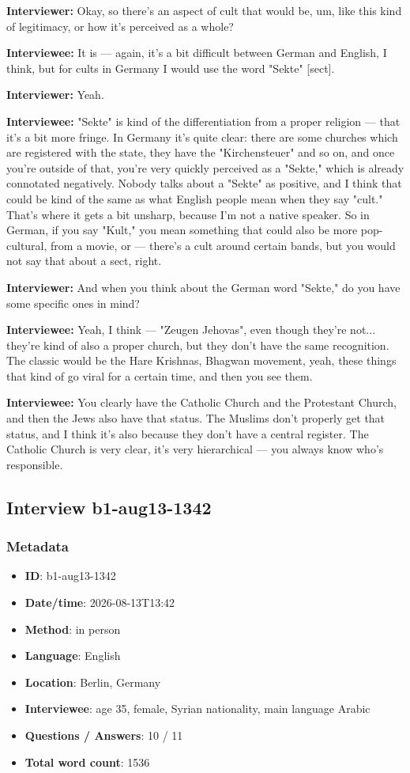 \textbf{Interviewer:} Okay, so there's an aspect of cult that would be, um, like this kind of legitimacy, or how it's perceived as a whole?

\textbf{Interviewee:} It is — again, it's a bit difficult between German and English, I think, but for cults in Germany I would use the word "Sekte" [sect].

\textbf{Interviewer:} Yeah.

\textbf{Interviewee:} "Sekte" is kind of the differentiation from a proper religion — that it's a bit more fringe. In Germany it's quite clear: there are some churches which are registered with the state, they have the "Kirchensteuer" and so on, and once you're outside of that, you're very quickly perceived as a "Sekte," which is already connotated negatively. Nobody talks about a "Sekte" as positive, and I think that could be kind of the same as what English people mean when they say "cult." That's where it gets a bit unsharp, because I'm not a native speaker. So in German, if you say "Kult," you mean something that could also be more pop-cultural, from a movie, or — there's a cult around certain bands, but you would not say that about a sect, right.

\textbf{Interviewer:} And when you think about the German word "Sekte," do you have some specific ones in mind?

\textbf{Interviewee:} Yeah, I think — "Zeugen Jehovas", even though they're not... they're kind of also a proper church, but they don't have the same recognition. The classic would be the Hare Krishnas, Bhagwan movement, yeah, these things that kind of go viral for a certain time, and then you see them.

\textbf{Interviewee:} You clearly have the Catholic Church and the Protestant Church, and then the Jews also have that status. The Muslims don't properly get that status, and I think it's also because they don't have a central register. The Catholic Church is very clear, it's very hierarchical — you always know who's responsible.

\subsection{Interview b1-aug13-1342}\label{int:b1-aug13-1342}
\subsubsection*{Metadata}
\begin{itemize}
  \item \textbf{ID}: b1-aug13-1342
  \item \textbf{Date/time}: 2026-08-13T13:42
  \item \textbf{Method}: in person
  \item \textbf{Language}: English
  \item \textbf{Location}: Berlin, Germany
  \item \textbf{Interviewee}: age 35, female, Syrian nationality, main language Arabic
  \item \textbf{Questions / Answers}: 10 / 11
  \item \textbf{Total word count}: 1536
\end{itemize}
